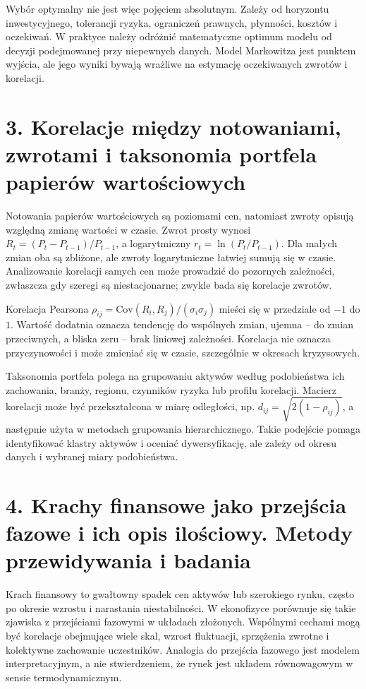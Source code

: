 \documentclass[11pt,a4paper,oneside]{report}
\begin{document}
Wybór optymalny nie jest więc pojęciem absolutnym. Zależy od horyzontu inwestycyjnego, tolerancji ryzyka, ograniczeń prawnych, płynności, kosztów i oczekiwań. W praktyce należy odróżnić matematyczne optimum modelu od decyzji podejmowanej przy niepewnych danych. Model Markowitza jest punktem wyjścia, ale jego wyniki bywają wrażliwe na estymację oczekiwanych zwrotów i korelacji.

\section{3. Korelacje między notowaniami, zwrotami i taksonomia portfela papierów wartościowych}
Notowania papierów wartościowych są poziomami cen, natomiast zwroty opisują względną zmianę wartości w czasie. Zwrot prosty wynosi \(R_t=(P_t-P_{t-1})/P_{t-1}\), a logarytmiczny \(r_t=\ln(P_t/P_{t-1})\). Dla małych zmian oba są zbliżone, ale zwroty logarytmiczne łatwiej sumują się w czasie. Analizowanie korelacji samych cen może prowadzić do pozornych zależności, zwłaszcza gdy szeregi są niestacjonarne; zwykle bada się korelacje zwrotów.

Korelacja Pearsona \(\rho_{ij}=\mathrm{Cov}(R_i,R_j)/(\sigma_i\sigma_j)\) mieści się w przedziale od \(-1\) do \(1\). Wartość dodatnia oznacza tendencję do wspólnych zmian, ujemna – do zmian przeciwnych, a bliska zeru – brak liniowej zależności. Korelacja nie oznacza przyczynowości i może zmieniać się w czasie, szczególnie w okresach kryzysowych.

Taksonomia portfela polega na grupowaniu aktywów według podobieństwa ich zachowania, branży, regionu, czynników ryzyka lub profilu korelacji. Macierz korelacji może być przekształcona w miarę odległości, np. \(d_{ij}=\sqrt{2(1-\rho_{ij})}\), a następnie użyta w metodach grupowania hierarchicznego. Takie podejście pomaga identyfikować klastry aktywów i oceniać dywersyfikację, ale zależy od okresu danych i wybranej miary podobieństwa.

\section{4. Krachy finansowe jako przejścia fazowe i ich opis ilościowy. Metody przewidywania i badania}
Krach finansowy to gwałtowny spadek cen aktywów lub szerokiego rynku, często po okresie wzrostu i narastania niestabilności. W ekonofizyce porównuje się takie zjawiska z przejściami fazowymi w układach złożonych. Wspólnymi cechami mogą być korelacje obejmujące wiele skal, wzrost fluktuacji, sprzężenia zwrotne i kolektywne zachowanie uczestników. Analogia do przejścia fazowego jest modelem interpretacyjnym, a nie stwierdzeniem, że rynek jest układem równowagowym w sensie termodynamicznym.
\end{document}
